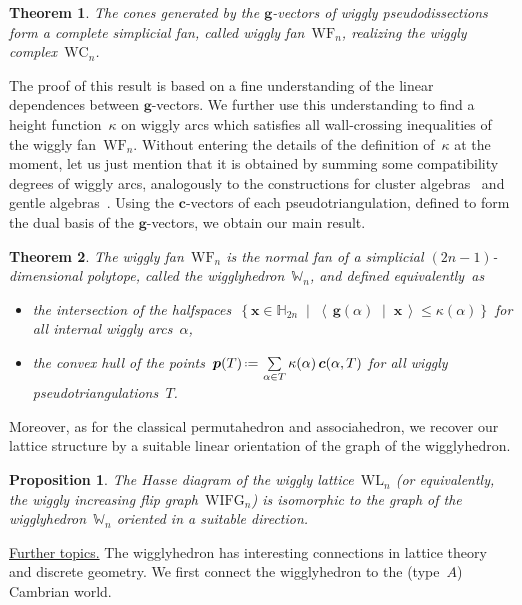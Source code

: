 \documentclass{amsart}
\newtheorem*{theorem*}{Theorem}%
\newtheorem*{proposition*}{Proposition}%
\theoremstyle{definition}
\newcommand{\HH}{\mathbb{H}} %
\renewcommand{\b}[1]{{\boldsymbol{#1}}} %
\newcommand{\set}[2]{\left\{ #1 \;\middle|\; #2 \right\}} %
\newcommand{\dotprod}[2]{\left\langle \, #1 \; \middle| \; #2 \, \right\rangle} %
\newcommand{\eqdef}{\mbox{\,\raisebox{0.2ex}{\scriptsize\ensuremath{\mathrm:}}\ensuremath{=}\,}} %
\newcommand{\darkblue}{\color{darkblue}} %
\newcommand{\defn}[1]{\textsl{\darkblue #1}} %
\newcommand{\para}[1]{\smallskip\noindent\uline{#1.}} %
\newcommand{\polytope}[1]{\mathds{#1}} %
\newcommand{\wigglyComplex}{\mathrm{WC}} %
\newcommand{\wigglyIncreasingFlipGraph}{\mathrm{WIFG}} %
\newcommand{\wigglyLattice}{\mathrm{WL}} %
\newcommand{\wigglyFan}{\mathrm{WF}} %
\newcommand{\wigglyhedron}{\polytope{W}} %
\begin{document}
\begin{theorem*}
The cones generated by the $\b{g}$-vectors of wiggly pseudodissections form a complete simplicial fan, called \defn{wiggly fan}~$\wigglyFan_n$, realizing the wiggly complex~$\wigglyComplex_n$.
\end{theorem*}

The proof of this result is based on a fine understanding of the linear dependences between \mbox{$\b{g}$-vectors}.
We further use this understanding to find a height function~$\kappa$ on wiggly arcs which satisfies all wall-crossing inequalities of the wiggly fan~$\wigglyFan_n$.
Without entering the details of the definition of~$\kappa$ at the moment, let us just mention that it is obtained by summing some compatibility degrees of wiggly arcs, analogously to the constructions for cluster algebras~\cite{HohlwegPilaudStella} and gentle algebras~\cite{PaluPilaudPlamondon-nonkissing}.
Using the $\b{c}$-vectors of each pseudotriangulation, defined to form the dual basis of the $\b{g}$-vectors, we obtain our main result.

\begin{theorem*}
The wiggly fan~$\wigglyFan_n$ is the normal fan of a simplicial $(2n-1)$-dimensional polytope, called the \defn{wigglyhedron}~$\wigglyhedron_n$, and defined equivalently~as
\begin{itemize}
\item the intersection of the halfspaces~$\set{\b{x} \!\in\! \HH_{2n}\!}{\!\dotprod{\b{g}(\alpha)}{\b{x}} \!\le\! \kappa(\alpha)}$ for all internal wiggly arcs~$\alpha$,
\item the convex hull of the points~$\b{p}(T) \eqdef \sum\limits_{\alpha \in T} \kappa(\alpha) \, \b{c}(\alpha, T)$ for all wiggly pseudotriangulations~$T$.
\end{itemize}
\end{theorem*}

Moreover, as for the classical permutahedron and associahedron, we recover our lattice structure by a suitable linear orientation of the graph of the wigglyhedron.

\begin{proposition*}
The Hasse diagram of the wiggly lattice~$\wigglyLattice_n$ (or equivalently, the wiggly increasing flip graph~$\wigglyIncreasingFlipGraph_n$) is isomorphic to the graph of the wigglyhedron~$\wigglyhedron_n$ oriented in a suitable direction.
\end{proposition*}

\para{Further topics}
The wigglyhedron has interesting connections in lattice theory and discrete geometry.
We first connect the wigglyhedron to the (type~$A$) Cambrian world.
\end{document}
